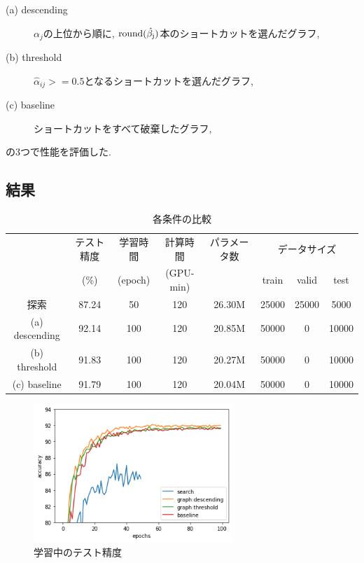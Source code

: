 \documentclass[twocolumn]{jarticle}     %
\begin{document}
\begin{description}
  \item[(a) descending] $\alpha_j$の上位から順に, $\rm{round}(\hat{\beta_j})$本のショートカットを選んだグラフ,
  \item[(b) threshold] $\hat{\alpha}_{ij} >= 0.5$となるショートカットを選んだグラフ,
  \item[(c) baseline] ショートカットをすべて破棄したグラフ,
\end{description}
の3つで性能を評価した.

\subsection{結果}

\begin{table}[tb]
  \begin{center}
    \caption{各条件の比較}
    \begin{tabular}{|c||c|c|c|c|c|c|c|} \hline
       & テスト精度  & 学習時間 & 計算時間 & パラメータ数 & \multicolumn{3}{c|}{データサイズ} \\
       & (\%)  & (epoch) & (GPU-min) & & train & valid & test \\ \hline \hline
      探索 & 87.24 & 50 & 120 & 26.30M & 25000 & 25000 & 5000 \\ \hline
      (a) descending & 92.14 & 100 & 120 & 20.85M & 50000 & 0 & 10000 \\ \hline
      (b) threshold & 91.83 & 100 & 120 & 20.27M & 50000 & 0 & 10000 \\ \hline
      (c) baseline & 91.79 & 100 & 120 & 20.04M & 50000 & 0 & 10000 \\ \hline
    \end{tabular}
    \label{tab:acc}
  \end{center}
\end{table}

\begin{figure}[tb]
	\begin{center}
		\includegraphics[clip,width=75mm]{acc.png}
		\caption{学習中のテスト精度}
		\label{fig:acc}
	\end{center}
\end{figure}
\end{document}
